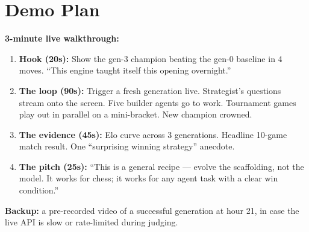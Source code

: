 \documentclass[11pt]{article}
\begin{document}
\section{Demo Plan}

\textbf{3-minute live walkthrough:}
\begin{enumerate}[leftmargin=*]
    \item \textbf{Hook (20s):} Show the gen-3 champion beating the gen-0 baseline in 4 moves. ``This engine taught itself this opening overnight.''
    \item \textbf{The loop (90s):} Trigger a fresh generation live. Strategist's questions stream onto the screen. Five builder agents go to work. Tournament games play out in parallel on a mini-bracket. New champion crowned.
    \item \textbf{The evidence (45s):} Elo curve across 3 generations. Headline 10-game match result. One ``surprising winning strategy'' anecdote.
    \item \textbf{The pitch (25s):} ``This is a general recipe --- evolve the scaffolding, not the model. It works for chess; it works for any agent task with a clear win condition.''
\end{enumerate}

\textbf{Backup:} a pre-recorded video of a successful generation at hour 21, in case the live API is slow or rate-limited during judging.
\end{document}
